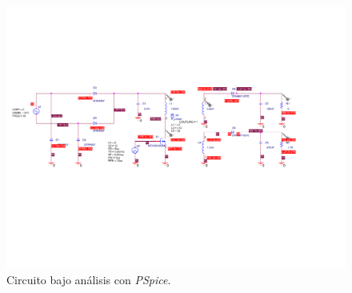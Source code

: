 \begin{figure}[H]
	\centering
	\includegraphics[scale=0.5]{Figuras/1_esquematico.pdf}
	\caption{Circuito bajo análisis con \textit{PSpice}.}
	\label{fig:esq}
\end{figure}

